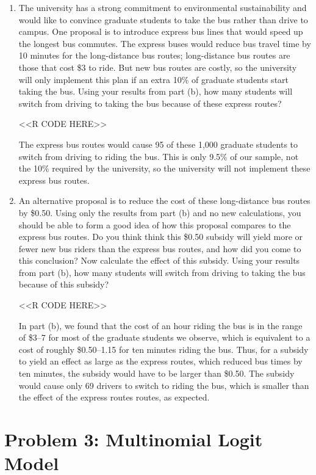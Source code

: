 \documentclass[11pt,letterpaper]{article}
\begin{document}
\begin{enumerate}[label=\alph*., leftmargin=*]
	\item The university has a strong commitment to environmental sustainability and would like to convince graduate students to take the bus rather than drive to campus. One proposal is to introduce express bus lines that would speed up the longest bus commutes. The express buses would reduce bus travel time by 10 minutes for the long-distance bus routes; long-distance bus routes are those that cost \$3 to ride. But new bus routes are costly, so the university will only implement this plan if an extra 10\% of graduate students start taking the bus. Using your results from part (b), how many students will switch from driving to taking the bus because of these express routes?

	<<R CODE HERE>>

	The express bus routes would cause 95 of these 1,000 graduate students to switch from driving to riding the bus. This is only 9.5\% of our sample, not the 10\% required by the university, so the university will not implement these express bus routes.
	
	\item An alternative proposal is to reduce the cost of these long-distance bus routes by \$0.50. Using only the results from part (b) and no new calculations, you should be able to form a good idea of how this proposal compares to the express bus routes. Do you think think this \$0.50 subsidy will yield more or fewer new bus riders than the express bus routes, and how did you come to this conclusion? Now calculate the effect of this subsidy. Using your results from part (b), how many students will switch from driving to taking the bus because of this subsidy?

	<<R CODE HERE>>

	In part (b), we found that the cost of an hour riding the bus is in the range of \$3--7 for most of the graduate students we observe, which is equivalent to a cost of roughly \$0.50--1.15 for ten minutes riding the bus. Thus, for a subsidy to yield an effect as large as the express routes, which reduced bus times by ten minutes, the subsidy would have to be larger than \$0.50. The subsidy would cause only 69 drivers to switch to riding the bus, which is smaller than the effect of the express routes routes, as expected.
\end{enumerate}

\section*{Problem 3: Multinomial Logit Model}
\end{document}
